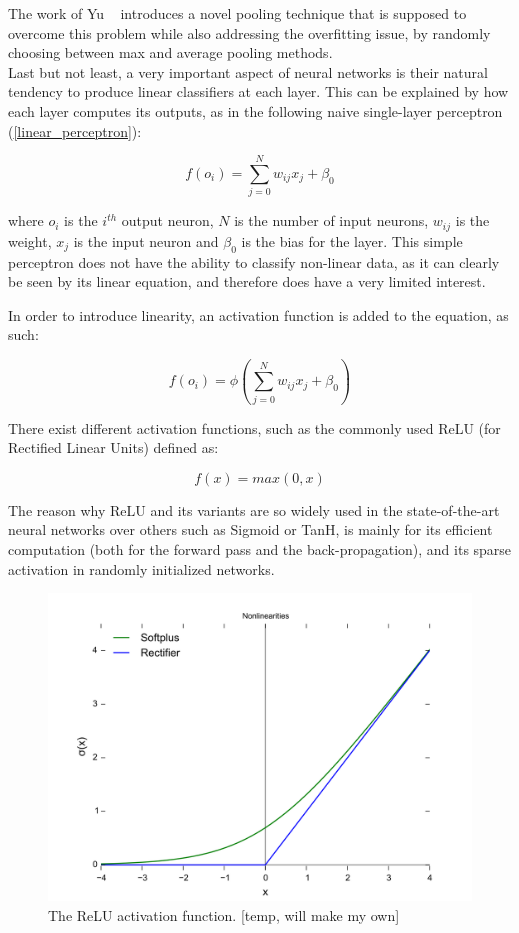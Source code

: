 The work of Yu \etal~\cite{MixedPooling} introduces a novel pooling
technique that is supposed to overcome this problem while also addressing the
overfitting issue, by randomly choosing between max and average pooling
methods.\\

Last but not least, a very important aspect of neural networks is their
natural tendency to produce linear classifiers at each layer. This can be
explained by how each layer computes its outputs, as in the following naive
single-layer perceptron (\ref{linear_perceptron}):

\begin{equation} \label{linear_perceptron}
	f(o_i) = \displaystyle\sum_{j=0}^{N} w_{ij}x_j+\beta_0
\end{equation}


where $o_i$ is the $i^{th}$ output neuron, $N$ is the number of input neurons,
$w_{ij}$ is the weight, $x_j$ is the input neuron and $\beta_0$ is the bias for
the layer. This simple perceptron does not have the ability to classify
non-linear data, as it can clearly be seen by its linear equation, and
therefore does have a very limited interest.

In order to introduce linearity, an activation function is added to the
equation, as such:

\begin{equation} \label{nonlinear_perceptron}
	f(o_i) = \phi(\displaystyle\sum_{j=0}^{N} w_{ij}x_j+\beta_0)
\end{equation}

There exist different activation functions, such as the commonly used ReLU (for
Rectified Linear Units) defined as:

\begin{equation} \label{relu}
	f(x) = max(0, x)
\end{equation}

The reason why ReLU and its variants are so widely used in the state-of-the-art
neural networks over others such as Sigmoid or TanH, is mainly for its
efficient computation (both for the forward pass and the back-propagation), and
its sparse activation in randomly initialized networks.

\begin{figure}[h]
	\center
	\includegraphics[width=0.4\linewidth]{figure/relu.png}
	\caption{The ReLU activation function. [temp, will make my own]}
\end{figure}

